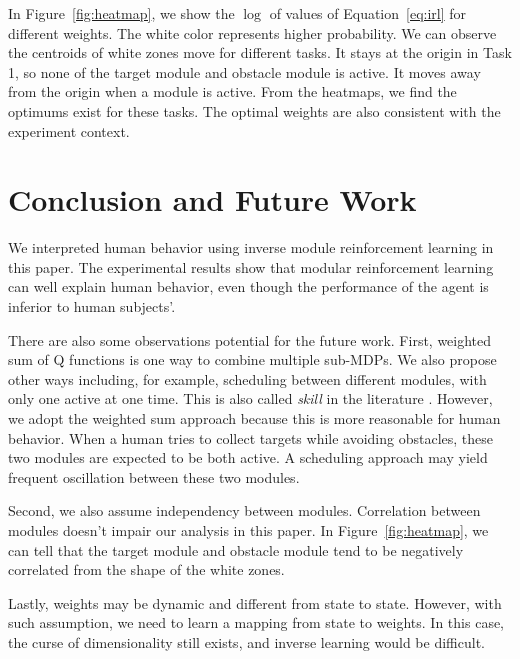 In Figure~\ref{fig:heatmap}, we show the $\log$ of values of
Equation~\ref{eq:irl} for different weights. The white color represents higher
probability. We can observe the centroids of white zones move for different
tasks. It stays at the origin in Task 1, so none of the target module and
obstacle module is active. It moves away from the origin when a module is
active.  From the heatmaps, we find the optimums exist for these tasks. The
optimal weights are also consistent with the experiment context.

\section{Conclusion and Future Work}
\label{sec:conclude}

We interpreted human behavior using inverse module reinforcement learning in
this paper. The experimental results show that modular reinforcement learning
can well explain human behavior, even though the performance of the agent is
inferior to human subjects'.

There are also some observations potential for the future work. First, 
weighted sum of Q functions is one way to combine multiple sub-MDPs. We also
propose other ways including, for example, scheduling between different modules,
with only one active at one time. This is also called {\em skill} in the literature
\cite{konidaris2009skill}. However, we adopt the weighted sum approach
because this is more reasonable for human behavior. When a human tries to collect
targets while avoiding obstacles, these two modules are expected to be both
active. A scheduling approach may yield frequent oscillation between these two
modules.

Second, we also assume independency between modules. Correlation between
modules doesn't impair our analysis in this paper. In Figure~\ref{fig:heatmap},
we can tell that the target module and obstacle module tend to be negatively
correlated from the shape of the white zones.

Lastly, weights may be dynamic and different from state to state. However, with
such assumption, we need to learn a mapping from state to weights. In this case,
the curse of dimensionality still exists, and inverse learning would be
difficult.


